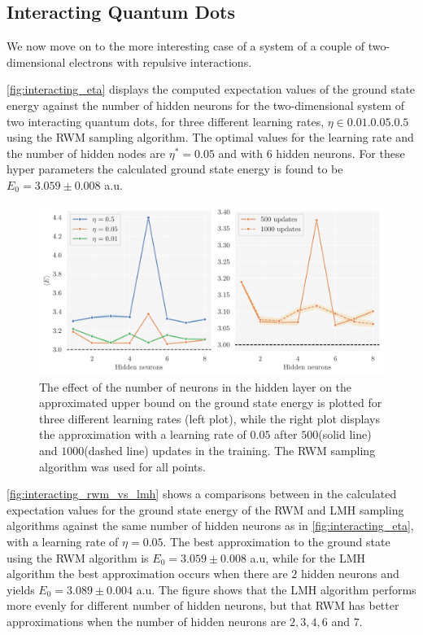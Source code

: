 \FloatBarrier

\subsection{Interacting Quantum Dots}

We now move on to the more interesting case of a system of a couple of two-dimensional electrons with repulsive interactions. 

\autoref{fig:interacting_eta} displays the computed expectation values of the ground state energy against the number of hidden neurons for the two-dimensional system of two interacting quantum dots, for three different learning rates, $\eta\in\qty{0.01, 0.05, 0.5}$ using the RWM sampling algorithm. The optimal values for the learning rate and the number of hidden nodes are $\eta^{*}=0.05$ and with $6$ hidden neurons. For these hyper parameters the calculated ground state energy is found to be $E_0 = 3.059\pm0.008$ a.u. 

\begin{figure}[!htb]
\begin{center}\includegraphics[width=\textwidth]{latex/figures/interacting_eta.pdf}
\end{center}
\caption{The effect of the number of neurons in the hidden layer on the approximated upper bound on the ground state energy is plotted for three different learning rates (left plot), while the right plot displays the approximation with a learning rate of $0.05$ after $500$(solid line) and $1000$(dashed line) updates in the training. The RWM sampling algorithm was used for all points.}
\label{fig:interacting_eta}
\end{figure}

\autoref{fig:interacting_rwm_vs_lmh} shows a comparisons between in the calculated expectation values for the ground state energy of the RWM and LMH sampling algorithms against the same number of hidden neurons as in \autoref{fig:interacting_eta}, with a learning rate of $\eta=0.05$. The best approximation to the ground state using the RWM algorithm is $E_0 = 3.059\pm0.008$ a.u, while for the LMH algorithm the best approximation occurs when there are $2$ hidden neurons and yields $E_0 = 3.089\pm0.004$ a.u. The figure shows that the LMH algorithm performs more evenly for different number of hidden neurons, but that RWM has better approximations when the number of hidden neurons are $2, 3, 4, 6$ and $7$. 

